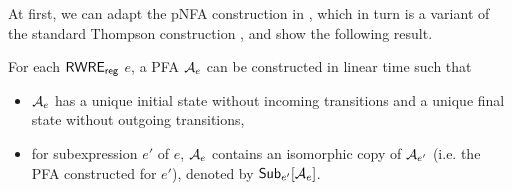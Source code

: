 At first, we can adapt the pNFA construction in \cite{BDM14}, which in turn is a variant of the standard Thompson construction \cite{Thompson68}, and show the following result. 

\begin{proposition}\label{prop-rwre-to-pfa}
For each ${\sf RWRE_{reg}}$ $e$, a PFA $\mathcal{A}_e$ can be constructed in linear time such that 
\begin{itemize}
\item $\mathcal{A}_e$ has a unique initial state without incoming transitions and a unique final state without outgoing transitions,
%
\item for subexpression $e'$ of $e$, $\mathcal{A}_e$ contains an isomorphic copy of $\mathcal{A}_{e'}$ (i.e. the PFA constructed for $e'$), denoted by ${\sf Sub}_{e'}[\mathcal{A}_e]$. 
\end{itemize}
\end{proposition}

%
%






 


